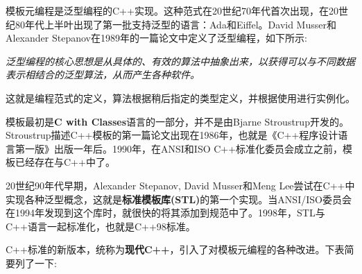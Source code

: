 模板元编程是泛型编程的C++实现。这种范式在20世纪70年代首次出现，在20世纪80年代上半叶出现了第一批支持泛型的语言：Ada和Eiffel。David Musser和Alexander Stepanov在1989年的一篇论文中定义了泛型编程，如下所示:

\begin{center}
\textit{
泛型编程的核心思想是从具体的、有效的算法中抽象出来，以获得可以与不同数据表示相结合的泛型算法，从而产生各种软件。
}
\end{center}

这就是编程范式的定义，算法根据稍后指定的类型定义，并根据使用进行实例化。

模板最初是\textbf{C with Classes}语言的一部分，并不是由Bjarne Stroustrup开发的。Stroustrup描述C++模板的第一篇论文出现在1986年，也就是《C++程序设计语言第一版》出版一年后。1990年，在ANSI和ISO C++标准化委员会成立之前，模板已经存在与C++中了。

20世纪90年代早期，Alexander Stepanov, David Musser和Meng Lee尝试在C++中实现各种泛型概念，这就是\textbf{标准模板库(STL)}的第一个实现。当ANSI/ISO委员会在1994年发现到这个库时，就很快的将其添加到规范中了。1998年，STL与C++语言一起标准化，也就是C++98标准。

C++标准的新版本，统称为\textbf{现代C++}，引入了对模板元编程的各种改进。下表简要列了一下:

